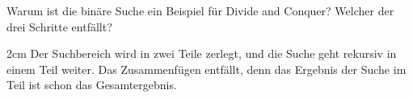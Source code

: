 \question[2]
Warum ist die binäre Suche ein Beispiel für Divide and Conquer? Welcher der drei Schritte entfällt?
\begin{solutionbox}{2cm}
Der Suchbereich wird in zwei Teile zerlegt, und die Suche geht rekursiv in einem Teil weiter. Das Zusammenfügen entfällt, denn das Ergebnis der Suche im Teil ist schon das Gesamtergebnis.
\end{solutionbox}
